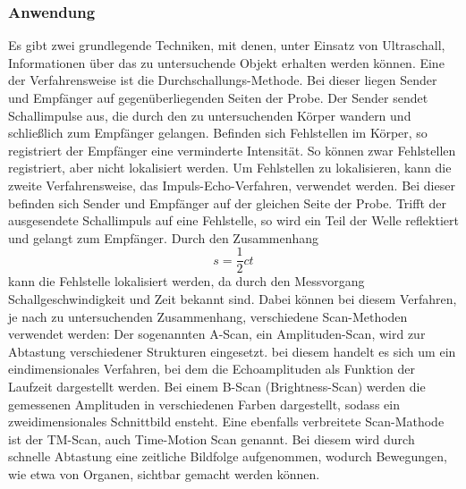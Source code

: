\subsubsection{Anwendung}
Es gibt zwei grundlegende Techniken, mit denen, unter Einsatz von Ultraschall, Informationen über das zu untersuchende Objekt erhalten werden können.
Eine der Verfahrensweise ist die Durchschallungs-Methode. Bei dieser liegen Sender und Empfänger auf gegenüberliegenden Seiten der Probe.
Der Sender sendet Schallimpulse aus, die durch den zu untersuchenden Körper wandern und schließlich zum Empfänger gelangen.
Befinden sich Fehlstellen im Körper, so registriert der Empfänger eine verminderte Intensität.
So können zwar Fehlstellen registriert, aber nicht lokalisiert werden.
Um Fehlstellen zu lokalisieren, kann die zweite Verfahrensweise, das Impuls-Echo-Verfahren, verwendet werden.
Bei dieser befinden sich Sender und Empfänger auf der gleichen Seite der Probe. Trifft der ausgesendete Schallimpuls auf eine Fehlstelle, so wird ein Teil der Welle reflektiert
und gelangt zum Empfänger. Durch den Zusammenhang
\begin{equation}
s=\frac{1}{2}c t
\end{equation}
kann die Fehlstelle lokalisiert werden, da durch den Messvorgang Schallgeschwindigkeit und Zeit bekannt sind.\newline
Dabei können bei diesem Verfahren, je nach zu untersuchenden Zusammenhang, verschiedene Scan-Methoden verwendet werden:
Der sogenannten A-Scan, ein Amplituden-Scan, wird zur Abtastung verschiedener Strukturen eingesetzt. bei diesem handelt es sich um ein eindimensionales Verfahren, bei dem die
Echoamplituden als Funktion der Laufzeit dargestellt werden.
Bei einem B-Scan (Brightness-Scan) werden die gemessenen Amplituden in verschiedenen Farben dargestellt, sodass ein zweidimensionales Schnittbild ensteht.
Eine ebenfalls verbreitete Scan-Mathode ist der TM-Scan, auch Time-Motion Scan genannt. Bei diesem wird durch schnelle Abtastung eine zeitliche Bildfolge aufgenommen, wodurch Bewegungen, wie etwa von Organen,
sichtbar gemacht werden können.
